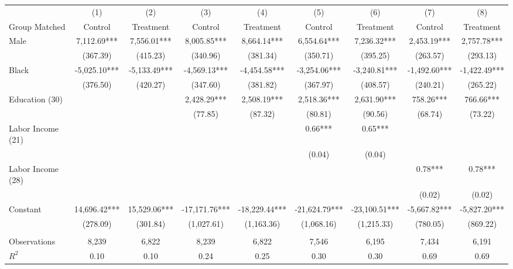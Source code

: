 \begin{tabular}{lcccccccc} \toprule
 & (1) & (2) & (3) & (4) & (5) & (6) & (7) & (8) \\
 Group Matched & Control & Treatment & Control & Treatment & Control & Treatment & Control & Treatment \\ \midrule
Male & 7,112.69*** & 7,556.01*** & 8,005.85*** & 8,664.14*** & 6,554.64*** & 7,236.32*** & 2,453.19*** & 2,757.78*** \\
 & (367.39) & (415.23) & (340.96) & (381.34) & (350.71) & (395.25) & (263.57) & (293.13) \\
Black & -5,025.10*** & -5,133.49*** & -4,569.13*** & -4,454.58*** & -3,254.06*** & -3,240.81*** & -1,492.60*** & -1,422.49*** \\
 & (376.50) & (420.27) & (347.60) & (381.82) & (367.97) & (408.57) & (240.21) & (265.22) \\
Education (30) &  &  & 2,428.29*** & 2,508.19*** & 2,518.36*** & 2,631.90*** & 758.26*** & 766.66*** \\
 &  &  & (77.85) & (87.32) & (80.81) & (90.56) & (68.74) & (73.22) \\
Labor Income (21) &  &  &  &  & 0.66*** & 0.65*** &  &  \\
 &  &  &  &  & (0.04) & (0.04) &  &  \\
Labor Income (28) &  &  &  &  &  &  & 0.78*** & 0.78*** \\
 &  &  &  &  &  &  & (0.02) & (0.02) \\
Constant & 14,696.42*** & 15,529.06*** & -17,171.76*** & -18,229.44*** & -21,624.79*** & -23,100.51*** & -5,667.82*** & -5,827.20*** \\
 & (278.09) & (301.84) & (1,027.61) & (1,163.36) & (1,068.16) & (1,215.33) & (780.05) & (869.22) \\ \\ \midrule 
 Observations & 8,239 & 6,822 & 8,239 & 6,822 & 7,546 & 6,195 & 7,434 & 6,191 \\
$R^2$ & 0.10 & 0.10 & 0.24 & 0.25 & 0.30 & 0.30 & 0.69 & 0.69 \\ \bottomrule
\end{tabular}
